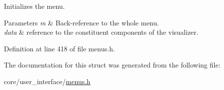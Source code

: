 Initializes the menu. 


\begin{DoxyParams}{Parameters}
{\em m} & Back-\/reference to the whole menu. \\
\hline
{\em data} & reference to the constituent components of the visualizer. \\
\hline
\end{DoxyParams}


Definition at line 418 of file menus.\+h.



The documentation for this struct was generated from the following file\+:\begin{DoxyCompactItemize}
\item 
core/user\+\_\+interface/\hyperlink{menus_8h}{menus.\+h}\end{DoxyCompactItemize}
